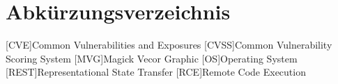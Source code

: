 \listoffigures

\renewcommand{\lstlistlistingname}{Auflistungsverzeichnis}
\lstlistoflistings
{}


\chapter*{Abkürzungsverzeichnis}
\begin{acronym}[ECU]
    [CVE]{Common Vulnerabilities and Exposures}
    [CVSS]{Common Vulnerability Scoring System}
    [MVG]{Magick Vecor Graphic}
    [OS]{Operating System}
    [REST]{Representational State Transfer}
    [RCE]{Remote Code Execution}
\end{acronym}
